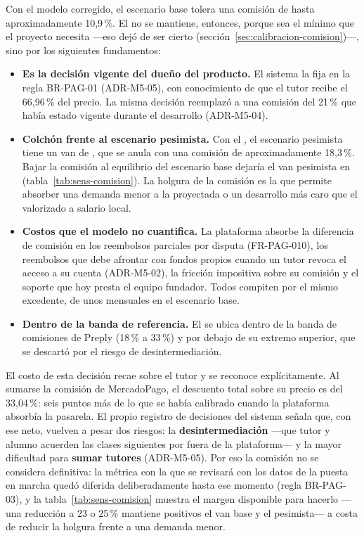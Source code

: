Con el modelo corregido, el escenario base tolera una comisión de hasta
aproximadamente 10,9\,\%. El \comision{} no se mantiene, entonces, porque
sea el mínimo que el proyecto necesita —eso dejó de ser cierto
(sección~\ref{sec:calibracion-comision})—, sino por los siguientes
fundamentos:

\begin{itemize}
    \item \textbf{Es la decisión vigente del dueño del producto.} El
          sistema la fija en la regla BR-PAG-01 (ADR-M5-05), con
          conocimiento de que el tutor recibe el 66,96\,\% del precio. La
          misma decisión reemplazó a una comisión del 21\,\% que había
          estado vigente durante el desarrollo (ADR-M5-04).
    \item \textbf{Colchón frente al escenario pesimista.} Con el
          \comision{}, el escenario pesimista tiene un \gls{van} de
          , que se anula con una comisión de aproximadamente
          18,3\,\%. Bajar la comisión al equilibrio del escenario base
          dejaría el \gls{van} pesimista en 
          (tabla~\ref{tab:sens-comision}). La holgura de la comisión es la
          que permite absorber una demanda menor a la proyectada o un
          desarrollo más caro que el valorizado a salario local.
    \item \textbf{Costos que el modelo no cuantifica.} La plataforma
          absorbe la diferencia de comisión en los reembolsos parciales
          por disputa (FR-PAG-010), los reembolsos que debe afrontar con
          fondos propios cuando un tutor revoca el acceso a su cuenta
          (ADR-M5-02), la fricción impositiva sobre su comisión y el
          soporte que hoy presta el equipo fundador. Todos compiten por el
          mismo excedente, de unos  mensuales en el escenario
          base.
    \item \textbf{Dentro de la banda de referencia.} El \comision{} se
          ubica dentro de la banda de comisiones de Preply (18\,\% a
          33\,\%) \citep{preply} y por debajo de su extremo superior, que
          se descartó por el riesgo de desintermediación.
\end{itemize}

El costo de esta decisión recae sobre el tutor y se reconoce
explícitamente. Al sumarse la comisión de MercadoPago, el descuento total
sobre su precio es del 33,04\,\%: seis puntos más de lo que se había
calibrado cuando la plataforma absorbía la pasarela. El propio registro
de decisiones del sistema señala que, con ese neto, vuelven a pesar dos
riesgos: la \textbf{desintermediación} —que tutor y alumno acuerden las
clases siguientes por fuera de la plataforma— y la mayor dificultad para
\textbf{sumar tutores} (ADR-M5-05). Por eso la comisión no se considera
definitiva: la métrica con la que se revisará con los datos de la puesta en marcha quedó
diferida deliberadamente hasta ese momento (regla BR-PAG-03), y la
tabla~\ref{tab:sens-comision} muestra el margen disponible para hacerlo
—una reducción a 23 o 25\,\% mantiene positivos el \gls{van} base y el
pesimista— a costa de reducir la holgura frente a una demanda menor.

